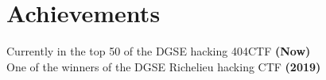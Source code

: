 \documentclass[a4paper,10pt]{article}
\begin{document}
\begin{adjustbox}{valign=t}
\begin{minipage}{0.6\textwidth}





\section*{Achievements}
\begin{spacing}{1.0}
    \raggedright
    Currently in the top 50 of the DGSE hacking 404CTF \textbf{(Now)}\\
    One of the winners of the DGSE Richelieu hacking CTF \textbf{(2019)}
\end{spacing}
\vspace{-1.0mm}

\setlength{\columnsep}{-2cm}
\begin{multicols}{2}


\end{multicols}
\end{minipage}
\end{adjustbox}
\end{document}
